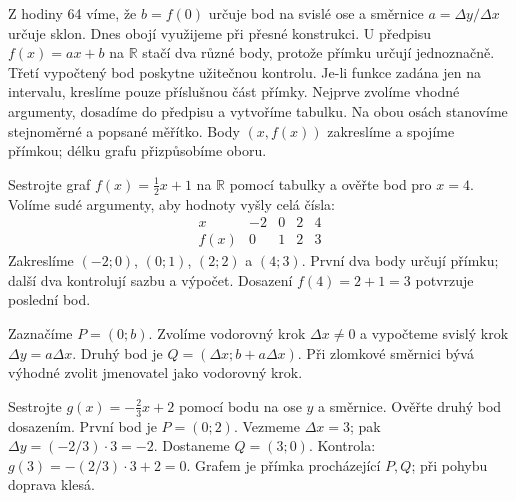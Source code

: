\documentclass[11pt,a4paper]{article}
\begin{document}
Z hodiny 64 víme, že $b=f(0)$ určuje bod na svislé ose a směrnice $a=\Delta y/\Delta x$ určuje sklon. Dnes obojí využijeme při přesné konstrukci. U předpisu $f(x)=ax+b$ na $\mathbb R$ stačí dva různé body, protože přímku určují jednoznačně. Třetí vypočtený bod poskytne užitečnou kontrolu. Je-li funkce zadána jen na intervalu, kreslíme pouze příslušnou část přímky.
Nejprve zvolíme vhodné argumenty, dosadíme do předpisu a vytvoříme tabulku. Na obou osách stanovíme stejnoměrné a popsané měřítko. Body $(x,f(x))$ zakreslíme a spojíme přímkou; délku grafu přizpůsobíme oboru.
\begin{prikladReseniBox}
Sestrojte graf $f(x)=\frac12x+1$ na $\mathbb R$ pomocí tabulky a ověřte bod pro $x=4$.
\tcblower
Volíme sudé argumenty, aby hodnoty vyšly celá čísla:
\[
\begin{array}{c|rrrr}x&-2&0&2&4\\\hline f(x)&0&1&2&3\end{array}
\]
Zakreslíme $(-2;0)$, $(0;1)$, $(2;2)$ a $(4;3)$. První dva body určují přímku; další dva kontrolují sazbu a výpočet. Dosazení $f(4)=2+1=3$ potvrzuje poslední bod.
\end{prikladReseniBox}
\begin{center}
\end{center}
Zaznačíme $P=(0;b)$. Zvolíme vodorovný krok $\Delta x\ne0$ a vypočteme svislý krok $\Delta y=a\Delta x$. Druhý bod je $Q=(\Delta x;b+a\Delta x)$. Při zlomkové směrnici bývá výhodné zvolit jmenovatel jako vodorovný krok.
\begin{prikladReseniBox}
Sestrojte $g(x)=-\frac23x+2$ pomocí bodu na ose $y$ a směrnice. Ověřte druhý bod dosazením.
\tcblower
První bod je $P=(0;2)$. Vezmeme $\Delta x=3$; pak $\Delta y=(-2/3)\cdot3=-2$. Dostaneme $Q=(3;0)$. Kontrola: $g(3)=-(2/3)\cdot3+2=0$. Grafem je přímka procházející $P,Q$; při pohybu doprava klesá.
\end{prikladReseniBox}
\end{document}
